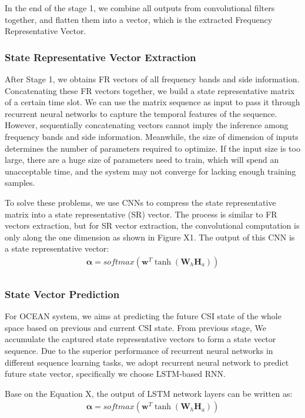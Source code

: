 \documentclass[10pt,journal,cspaper,compsoc]{IEEEtran}
\begin{document}
In the end of the stage 1, we combine all outputs from convolutional filters together, and flatten them into a vector, which is the extracted Frequency Representative Vector.

\subsubsection{State Representative Vector Extraction}
After Stage 1, we obtains FR vectors of all frequency bands and side information. Concatenating these FR vectors together, we build a state representative matrix of a certain time slot. We can use the matrix sequence as input to pass it through recurrent neural networks to capture the temporal features of the sequence. However, sequentially concatenating vectors cannot imply the inference among frequency bands and side information. Meanwhile, the size of dimension of inputs determines the number of parameters required to optimize. If the input size is too large, there are a huge size of parameters need to train, which will spend an unacceptable time, and the system may not converge for lacking enough training samples. 

To solve these problems, we use CNNs to compress the state representative matrix into a state representative (SR) vector. The process is similar to FR vectors extraction, but for SR vector extraction, the convolutional computation is only along the one dimension as shown in Figure X1. The output of this CNN is a state representative vector:
\begin{eqnarray}
	\mathbf{\alpha}  = softmax \left( {{\mathbf{w}^T}\tanh({\mathbf{W}_h}\mathbf{H}_a)} \right)\label{eq:9}\\
\end{eqnarray}

\subsubsection{State Vector Prediction}

For OCEAN system, we aims at predicting the future CSI state of the whole space based on previous and current CSI state. From previous stage, We accumulate the captured state representative vectors to form a state vector sequence. Due to the superior performance of recurrent neural networks in different sequence learning tasks, we adopt recurrent neural network to predict future state vector, specifically we choose LSTM-based RNN.

Base on the Equation X, the output of LSTM network layers can be written as:
\begin{eqnarray}
	\mathbf{\alpha}  = softmax \left( {{\mathbf{w}^T}\tanh({\mathbf{W}_h}\mathbf{H}_a)} \right)\label{eq:9}\\
\end{eqnarray}
\end{document}
